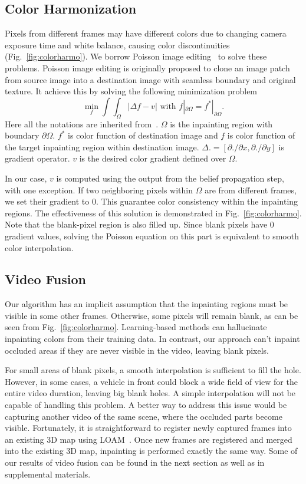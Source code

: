 \documentclass[runningheads]{llncs}
\begin{document}
\subsection{Color Harmonization}
Pixels from different frames may have different colors due to changing camera exposure time and white balance, causing color discontinuities (Fig.~\ref{fig:colorharmo}). We borrow Poisson image editing~\cite{Perez:2003:PIE:1201775.882269} to solve these problems. Poisson image editing is originally proposed to clone an image patch from source image into a destination image with seamless boundary and original texture. It achieve this by solving the following minimization problem 
\begin{equation}
    \min_f{\int\int_\Omega|\Delta f-v|}  \text{   with   } f|_{\partial\Omega}=f^*|_{\partial\Omega}.
	\label{equ:poisson}
\end{equation}
Here all the notations are inherited from~\cite{Perez:2003:PIE:1201775.882269}. $\Omega$ is the inpainting region with boundary $\partial\Omega$. $f^*$ is color function of destination image and $f$ is color function of the target inpainting region within destination image. $\Delta.=[\partial./\partial x, \partial./\partial y]$ is gradient operator. $v$ is the desired color gradient defined over $\Omega$.

In our case, $v$ is computed using the output from the belief propagation step, with one exception. If two neighboring pixels within $\Omega$ are from different frames, we set their gradient to 0. This guarantee color consistency within the inpainting regions. The effectiveness of this solution is demonstrated in Fig.~\ref{fig:colorharmo}. Note that the blank-pixel region is also filled up. Since blank pixels have 0 gradient values, solving the Poisson equation on this part is equivalent to smooth color interpolation.

\subsection{Video Fusion} 
Our algorithm has an implicit assumption that the inpainting regions must be visible in some other frames. Otherwise, some pixels will remain blank, as can be seen from Fig.~\ref{fig:colorharmo}. Learning-based methods can hallucinate inpainting colors from their training data. In contrast, our approach can't inpaint occluded areas if they are never visible in the video, leaving blank pixels.   

For small areas of blank pixels, a smooth interpolation is sufficient to fill the hole. However, in some cases, a vehicle in front could block a wide field of view for the entire video duration, leaving big blank holes. A simple interpolation will not be capable of handling this problem. A better way to address this issue would be capturing another video of the same scene, where the occluded parts become visible. Fortunately, it is straightforward to register newly captured frames into an existing 3D map using LOAM~\cite{Zhang-2014-7903}. Once new frames are registered and merged into the existing 3D map, inpainting is performed exactly the same way. Some of our results of video fusion can be found in the next section as well as in supplemental materials.
\end{document}
